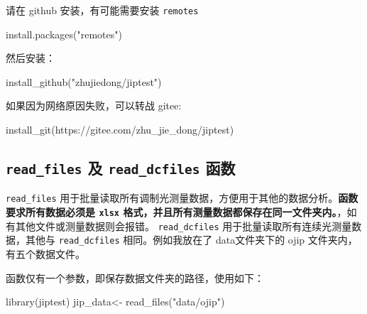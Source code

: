 \documentclass[
]{krantz}
\makeatletter
\newenvironment{Shaded}{\begin{snugshade}}{\end{snugshade}}
\newcommand{\FunctionTok}[1]{\textcolor[rgb]{0.00,0.00,0.00}{#1}}
\newcommand{\NormalTok}[1]{#1}
\newcommand{\OtherTok}[1]{\textcolor[rgb]{0.56,0.35,0.01}{#1}}
\newcommand{\StringTok}[1]{\textcolor[rgb]{0.31,0.60,0.02}{#1}}
\newenvironment{kframe}{%
\medskip{}
\setlength{\fboxsep}{.8em}
 \def\at@end@of@kframe{}%
 \ifinner\ifhmode%
  \def\at@end@of@kframe{\end{minipage}}%
  \begin{minipage}{\columnwidth}%
 \fi\fi%
 \def\FrameCommand##1{\hskip\@totalleftmargin \hskip-\fboxsep
 \colorbox{shadecolor}{##1}\hskip-\fboxsep
     \hskip-\linewidth \hskip-\@totalleftmargin \hskip\columnwidth}%
 \MakeFramed {\advance\hsize-\width
   \@totalleftmargin\z@ \linewidth\hsize
   \@setminipage}}%
 {\par\unskip\endMakeFramed%
 \at@end@of@kframe}
\renewenvironment{Shaded}{\begin{kframe}}{\end{kframe}}
\makeatother
\begin{document}
请在 github 安装，有可能需要安装 \texttt{remotes}

\begin{Shaded}
\begin{Highlighting}[]
\FunctionTok{install.packages}\NormalTok{(}\StringTok{"remotes"}\NormalTok{)}
\end{Highlighting}
\end{Shaded}

然后安装：

\begin{Shaded}
\begin{Highlighting}[]
\FunctionTok{install\_github}\NormalTok{(}\StringTok{"zhujiedong/jiptest"}\NormalTok{)}
\end{Highlighting}
\end{Shaded}

如果因为网络原因失败，可以转战 gitee:

\begin{Shaded}
\begin{Highlighting}[]
\FunctionTok{install\_git}\NormalTok{(}\StringTok{\textquotesingle{}https://gitee.com/zhu\_jie\_dong/jiptest\textquotesingle{}}\NormalTok{)}
\end{Highlighting}
\end{Shaded}

\hypertarget{readfluor}{%
\subsection{\texorpdfstring{\texttt{read\_files} 及 \texttt{read\_dcfiles} 函数}{read\_files 及 read\_dcfiles 函数}}\label{readfluor}}

\texttt{read\_files} 用于批量读取所有调制光测量数据，方便用于其他的数据分析。\textbf{函数要求所有数据必须是 \texttt{xlsx} 格式，并且所有测量数据都保存在同一文件夹内。}，如有其他文件或测量数据则会报错。
\texttt{read\_dcfiles} 用于批量读取所有连续光测量数据，其他与 \texttt{read\_dcfiles} 相同。例如我放在了 data文件夹下的 ojip 文件夹内，有五个数据文件。

函数仅有一个参数，即保存数据文件夹的路径，使用如下：

\begin{Shaded}
\begin{Highlighting}[]
\FunctionTok{library}\NormalTok{(jiptest)}
\NormalTok{jip\_data}\OtherTok{\textless{}{-}} \FunctionTok{read\_files}\NormalTok{(}\StringTok{"data/ojip"}\NormalTok{)}
\end{Highlighting}
\end{Shaded}
\end{document}
